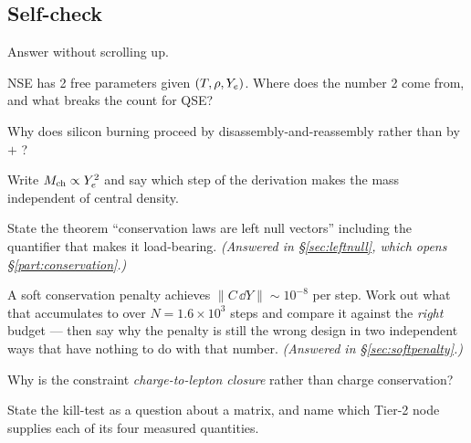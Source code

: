 \subsection{Self-check}
\label{sec:selfcheck-setting}

Answer without scrolling up.

\begin{selfcheck}
\item NSE has 2 free parameters given $(T, \rho, Y_{e})$. Where does the number 2
  come from, and what breaks the count for QSE?
\item Why does silicon burning proceed by disassembly-and-reassembly rather than
  by  $+$ ?
\item Write $M_{\mathrm{ch}} \propto Y_{e}^2$ and say which step of the derivation makes the
  mass independent of central density.
\item State the theorem ``conservation laws are left null vectors'' including
  the quantifier that makes it load-bearing. \emph{(Answered in
  \S\ref{sec:leftnull}, which opens \S\ref{part:conservation}.)}
\item A soft conservation penalty achieves $\|C\,\dd Y\| \sim 10^{-8}$ per step.
  Work out what that accumulates to over $N = 1.6\times10^{3}$ steps and compare
  it against the \emph{right} budget --- then say why the penalty is still the
  wrong design in two independent ways that have nothing to do with that number.
  \emph{(Answered in \S\ref{sec:softpenalty}.)}
\item Why is the constraint \emph{charge-to-lepton closure} rather than charge
  conservation?
\item State the kill-test as a question about a matrix, and name which Tier-2
  node supplies each of its four measured quantities.
\end{selfcheck}
